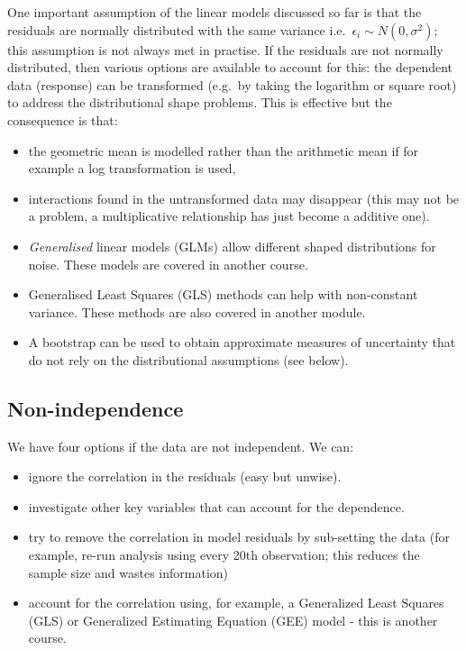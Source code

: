 \documentclass[
  oneside]{krantz}
\providecommand{\tightlist}{%
  \setlength{\itemsep}{0pt}\setlength{\parskip}{0pt}}
\begin{document}
One important assumption of the linear models discussed so far is that the residuals are normally distributed with the same variance i.e.~\(\epsilon_i \sim N(0, \sigma^2)\); this assumption is not always met in practise. If the residuals are not normally distributed, then various options are available to account for this:
the dependent data (response) can be transformed (e.g.~by taking the logarithm or square root) to address the distributional shape problems. This is effective but the consequence is that:

\begin{itemize}
\item
  the geometric mean is modelled rather than the arithmetic mean if for example a log transformation is used,
\item
  interactions found in the untransformed data may disappear (this may not be a problem, a multiplicative relationship has just become a additive one).
\item
  \emph{Generalised} linear models (GLMs) allow different shaped distributions for noise. These models are covered in another course.
\item
  Generalised Least Squares (GLS) methods can help with non-constant variance. These methods are also covered in another module.
\item
  A bootstrap can be used to obtain approximate measures of uncertainty that do not rely on the distributional assumptions (see below).
\end{itemize}

\hypertarget{non-independence}{%
\subsection{Non-independence}\label{non-independence}}

We have four options if the data are not independent. We can:

\begin{itemize}
\tightlist
\item
  ignore the correlation in the residuals (easy but unwise).
\item
  investigate other key variables that can account for the dependence.
\item
  try to remove the correlation in model residuals by sub-setting the data (for example, re-run analysis using every 20th observation; this reduces the sample size and wastes information)
\item
  account for the correlation using, for example, a Generalized Least Squares (GLS) or Generalized Estimating Equation (GEE) model - this is another course.
\end{itemize}
\end{document}
